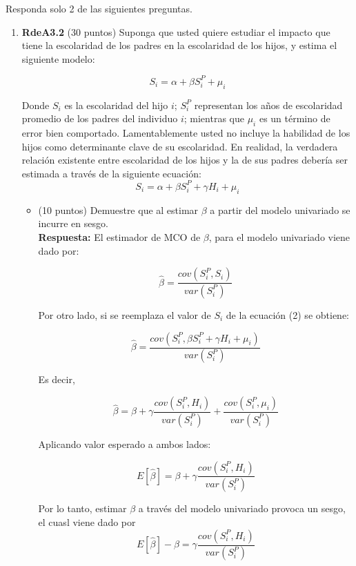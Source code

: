 \documentclass[10pt,a4paper]{article}
\begin{document}
Responda solo 2 de las siguientes preguntas.
\begin{enumerate}
      \item \textbf{RdeA3.2} (30 puntos)
      Suponga que usted quiere estudiar el impacto que tiene la escolaridad de los padres en la escolaridad de los hijos, y estima el siguiente modelo:

\begin{equation}
    S_i = \alpha + \beta S^P_i + \mu_i
\end{equation}


      Donde $S_i$ es la escolaridad del hijo $i$; $S^P_i$ representan los años de escolaridad promedio de los padres del individuo $i$; mientras que $\mu_i$ es un término de error bien comportado. Lamentablemente usted no incluye la habilidad de los hijos como determinante clave de su escolaridad. En realidad, la verdadera relación existente entre escolaridad de los hijos y la de sus padres debería ser estimada a través de la siguiente ecuación:
\begin{equation}
    S_i = \alpha + \beta S^P_i + \gamma H_i + \mu_i
\end{equation}

        \begin{itemize}
            \item [a)] (10 puntos) Demuestre que al estimar $\beta$ a partir del modelo univariado se incurre en sesgo.\\

            \textbf{Respuesta:} El estimador de MCO de $\beta$, para el modelo univariado viene dado por:

            $$\hat{\beta} = \frac{cov(S^P_i, S_i)}{var(S^P_i)}$$

            Por otro lado, si se reemplaza el valor de $S_i$ de la ecuación (2) se obtiene:

            $$\hat{\beta} = \frac{cov(S^P_i, \beta S^P_i + \gamma H_i + \mu_i)}{var(S^P_i)}$$

            Es decir,

            $$\hat{\beta} = \beta + \gamma\frac{cov(S^P_i, H_i)}{var(S^P_i)} + \frac{cov(S^P_i,\mu_i)}{var(S^P_i)}$$

            Aplicando valor esperado a ambos lados:

            $$E[\hat{\beta}] = \beta + \gamma\frac{cov(S^P_i, H_i)}{var(S^P_i)}$$

            Por lo tanto, estimar $\beta$ a través del modelo univariado provoca un sesgo, el cuasl viene dado por
            $$E[\hat{\beta}] - \beta = \gamma\frac{cov(S^P_i, H_i)}{var(S^P_i)}$$



\end{itemize}
\end{enumerate}
\end{document}
